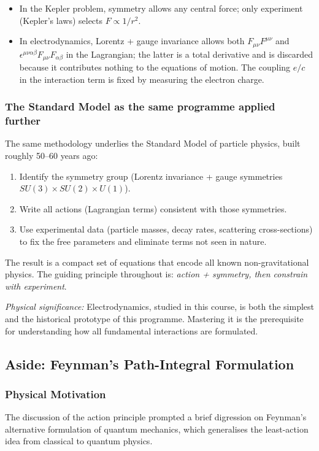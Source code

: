 \begin{itemize}
  \item In the Kepler problem, symmetry allows any central force; only experiment (Kepler's laws)
        selects $F\propto 1/r^2$.
  \item In electrodynamics, Lorentz + gauge invariance allows both $F_{\mu\nu}F^{\mu\nu}$ and
        $\epsilon^{\mu\nu\alpha\beta}F_{\mu\nu}F_{\alpha\beta}$ in the Lagrangian; the latter is a
        total derivative and is discarded because it contributes nothing to the equations of motion.
        The coupling $e/c$ in the interaction term is fixed by measuring the electron charge.
\end{itemize}

\subsubsection*{The Standard Model as the same programme applied further}

The same methodology underlies the Standard Model of particle physics, built roughly 50--60 years
ago:
\begin{enumerate}
  \item Identify the symmetry group (Lorentz invariance + gauge symmetries $SU(3)\times SU(2)\times
        U(1)$).
  \item Write all actions (Lagrangian terms) consistent with those symmetries.
  \item Use experimental data (particle masses, decay rates, scattering cross-sections) to fix the
        free parameters and eliminate terms not seen in nature.
\end{enumerate}
The result is a compact set of equations that encode all known non-gravitational physics.  The guiding
principle throughout is: \emph{action + symmetry, then constrain with experiment}.

\textit{Physical significance:} Electrodynamics, studied in this course, is both the simplest and
the historical prototype of this programme.  Mastering it is the prerequisite for understanding how
all fundamental interactions are formulated.

\subsection{Aside: Feynman's Path-Integral Formulation}\label{subsec:lec10-path-integral}

\subsubsection*{Physical Motivation}
The discussion of the action principle prompted a brief digression on Feynman's alternative
formulation of quantum mechanics, which generalises the least-action idea from classical to quantum
physics.

